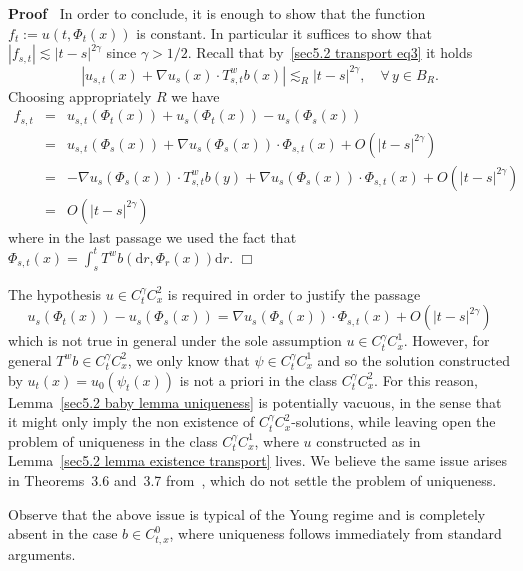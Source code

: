 \documentclass[10pt]{article}
\newcommand{\assign}{:=}
\newcommand{\mathd}{\mathrm{d}}
\newenvironment{proof}{\noindent\textbf{Proof\ }}{\hspace*{\fill}$\Box$\medskip}
\begin{document}
\begin{proof}
  In order to conclude, it is enough to show that the function $f_t \assign u
  (t, \Phi_t (x))$ is constant. In particular it suffices to show that $|
  f_{s, t} | \lesssim | t - s |^{2 \gamma}$ since $\gamma > 1 / 2$. Recall
  that by~{\eqref{sec5.2 transport eq3}} it holds
  \[ | u_{s, t} (x) + \nabla u_s (x) \cdot T^w_{s, t} b (x) | \lesssim_R | t -
     s |^{2 \gamma}, \quad \forall \, y \in B_R . \]
  Choosing appropriately $R$ we have
  \begin{eqnarray*}
    f_{s, t} & = & u_{s, t} (\Phi_t (x)) + u_s (\Phi_t (x)) - u_s (\Phi_s
    (x))\\
    & = & u_{s, t} (\Phi_s (x)) + \nabla u_s (\Phi_s (x)) \cdot \Phi_{s, t}
    (x) + O (| t - s |^{2 \gamma})\\
    & = & - \nabla u_s (\Phi_s (x)) \cdot T^w_{s, t} b (y) + \nabla u_s
    (\Phi_s (x)) \cdot \Phi_{s, t} (x) + O (| t - s |^{2 \gamma})\\
    & = & O (| t - s |^{2 \gamma})
  \end{eqnarray*}
  where in the last passage we used the fact that $\Phi_{s, t} (x) = \int_s^t
  T^w b (\mathd r, \Phi_r (x)) \mathd r$.
\end{proof}

\begin{remark}
  \label{sec5.2 remark limited use}The hypothesis $u \in C^{\gamma}_t C^2_x$
  is required in order to justify the passage
  \[ u_s (\Phi_t (x)) - u_s (\Phi_s (x)) = \nabla u_s (\Phi_s (x)) \cdot
     \Phi_{s, t} (x) + O (| t - s |^{2 \gamma}) \]
  which is not true in general under the sole assumption $u \in C^{\gamma}_t
  C^1_x$. However, for general $T^w b \in C^{\gamma}_t C^2_x$, we only know
  that $\psi \in C^{\gamma}_t C^1_x$ and so the solution constructed by $u_t
  (x) = u_0 (\psi_t (x))$ is not a priori in the class $C^{\gamma}_t C^2_x$.
  For this reason, Lemma~\ref{sec5.2 baby lemma uniqueness} is potentially
  vacuous, in the sense that it might only imply the non existence of
  $C^{\gamma}_t C^2_x$\mbox{-}solutions, while leaving open the problem of
  uniqueness in the class $C^{\gamma}_t C^1_x$, where $u$ constructed as in
  Lemma~\ref{sec5.2 lemma existence transport} lives. We believe the same
  issue arises in Theorems~3.6 and~3.7 from~{\cite{hu}}, which do not settle
  the problem of uniqueness.
\end{remark}

Observe that the above issue is typical of the Young regime and is completely
absent in the case $b \in C^0_{t, x}$, where uniqueness follows immediately
from standard arguments.
\end{document}

